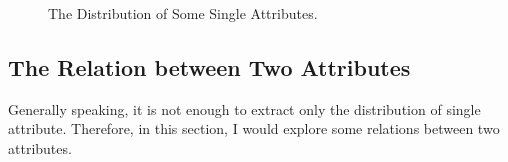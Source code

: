 \documentclass[12pt,a4paper]{article}
\theoremstyle{definition}
\begin{document}
\begin{figure}[htbp]
	\centering
	\caption{The Distribution of Some Single Attributes.}
	\label{fig:"single_dis}
\end{figure}

\subsection{The Relation between Two Attributes}
\label{sec::relation}
Generally speaking, it is not enough to extract only the distribution of single attribute. Therefore, in this section, I would explore some relations between two attributes.
\end{document}
